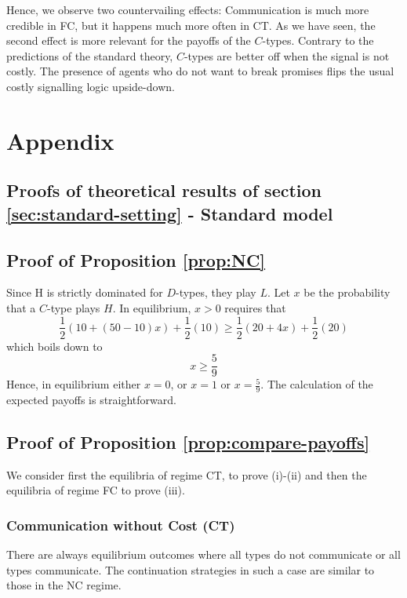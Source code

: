 \documentclass[12pt]{article}
\theoremstyle{break}
\begin{document}
Hence, we observe two countervailing effects: Communication is much more credible in FC, but it happens much more often in CT. As we have seen, the second effect is more relevant for the payoffs of the $C$-types. Contrary to the predictions of the standard theory, $C$-types are better off when the signal is not costly. The presence of agents who do not want to break promises flips the usual costly signalling logic upside-down.




%   
%    
\appendix
\section{Appendix}
\subsection{Proofs of theoretical results of section \ref{sec:standard-setting} - Standard model}
\subsection*{Proof of Proposition \ref{prop:NC}}
Since H is strictly dominated for $D$-types, they play $L$. Let $x$ be the probability that a $C$-type plays $H$. In equilibrium, $x>0$ requires that
\[
	\frac{1}{2}(10+(50-10)x)+\frac{1}{2}(10)\geq \frac{1}{2}(20+4 x)+\frac{1}{2}(20)
\]
which boils down to\[
x\geq \frac{5}{9}
	\]
Hence, in equilibrium either $x=0$, or $x=1$ or $x=\frac{5}{9}$. The calculation of the expected payoffs is straightforward. 


\subsection*{Proof of Proposition \ref{prop:compare-payoffs}}
We consider first the equilibria of regime CT, to prove (i)-(ii) and then the equilibria of regime FC to prove (iii).
%
\subsubsection*{Communication without Cost (CT)}
There are always equilibrium outcomes where all types do not communicate or all types communicate. The continuation strategies in such a case are similar to those in the NC regime.
\end{document}
